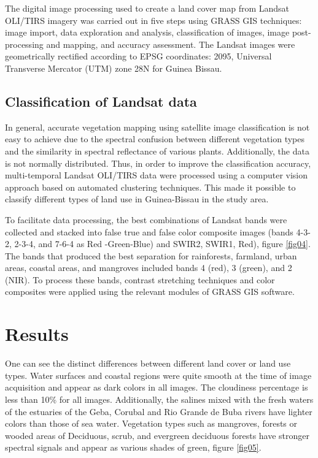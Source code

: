\documentclass[final,5p,times,twocolumn]{elsarticle}
\begin{document}
The digital image processing used to create a land cover map from Landsat OLI/TIRS imagery was carried out in five steps using GRASS GIS techniques: image import, data exploration and analysis, classification of images, image post-processing and mapping, and accuracy assessment. The Landsat images were geometrically rectified according to EPSG coordinates: 2095, Universal Transverse Mercator (UTM) zone 28N for Guinea Bissau.

\subsection{Classification of Landsat data}

In general, accurate vegetation mapping using satellite image classification is not easy to achieve due to the spectral confusion between different vegetation types and the similarity in spectral reflectance of various plants. Additionally, the data is not normally distributed. Thus, in order to improve the classification accuracy, multi-temporal Landsat OLI/TIRS data were processed using a computer vision approach based on automated clustering techniques. This made it possible to classify different types of land use in Guinea-Bissau in the study area.

To facilitate data processing, the best combinations of Landsat bands were collected and stacked into false true and false color composite images (bands 4-3-2, 2-3-4, and 7-6-4 as Red -Green-Blue) and SWIR2, SWIR1, Red), figure \ref{fig04}. The bands that produced the best separation for rainforests, farmland, urban areas, coastal areas, and mangroves included bands 4 (red), 3 (green), and 2 (NIR). To process these bands, contrast stretching techniques and color composites were applied using the relevant modules of GRASS GIS software.

\section{Results}

One can see the distinct differences between different land cover or land use types. Water surfaces and coastal regions were quite smooth at the time of image acquisition and appear as dark colors in all images. The cloudiness percentage is less than 10\% for all images. Additionally, the salines mixed with the fresh waters of the estuaries of the Geba, Corubal and Rio Grande de Buba rivers have lighter colors than those of sea water. Vegetation types such as mangroves, forests or wooded areas of Deciduous, scrub, and evergreen deciduous forests have stronger spectral signals and appear as various shades of green, figure \ref{fig05}.
\end{document}
